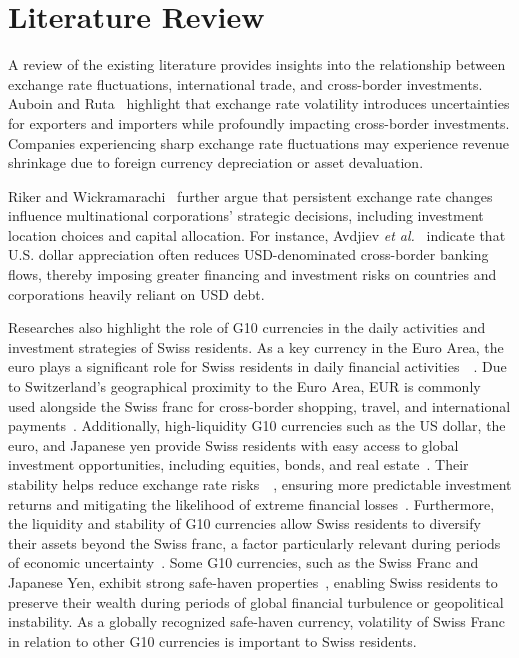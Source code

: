 \documentclass{article}
\begin{document}
\section{Literature Review}
A review of the existing literature provides insights into the relationship between exchange rate fluctuations, international trade, and cross-border investments. Auboin and Ruta~\cite{AUBOIN_RUTA_2013} highlight that exchange rate volatility introduces uncertainties for exporters and importers while profoundly impacting cross-border investments. Companies experiencing sharp exchange rate fluctuations may experience revenue shrinkage due to foreign currency depreciation or asset devaluation.

Riker and Wickramarachi~\cite{riker2020review} further argue that persistent exchange rate changes influence multinational corporations' strategic decisions, including investment location choices and capital allocation. For instance, Avdjiev \textit{et al.}~\cite{dollar_exchange} indicate that U.S. dollar appreciation often reduces USD-denominated cross-border banking flows, thereby imposing greater financing and investment risks on countries and corporations heavily reliant on USD debt.

Researches also highlight the role of G10 currencies in the daily activities and investment strategies of Swiss residents. As a key currency in the Euro Area, the euro plays a significant role for Swiss residents in daily financial activities~\cite{engel2016exchange}~\cite{goulferni2023switzerland}. Due to Switzerland's geographical proximity to the Euro Area, EUR is commonly used alongside the Swiss franc for cross-border shopping, travel, and international payments~\cite{sif_imf_reports}. Additionally, high-liquidity G10 currencies such as the US dollar, the euro, and Japanese yen provide Swiss residents with easy access to global investment opportunities, including equities, bonds, and real estate~\cite{rogoff2000six}. Their stability helps reduce exchange rate risks~\cite{campbell2002strategic}~\cite{engel2016exchange}, ensuring more predictable investment returns and mitigating the likelihood of extreme financial losses~\cite{de1998big}. Furthermore, the liquidity and stability of G10 currencies allow Swiss residents to diversify their assets beyond the Swiss franc, a factor particularly relevant during periods of economic uncertainty~\cite{ito2020currency}. Some G10 currencies, such as the Swiss Franc and Japanese Yen, exhibit strong safe-haven properties~\cite{ranaldo2010safe}, enabling Swiss residents to preserve their wealth during periods of global financial turbulence or geopolitical instability. As a globally recognized safe-haven currency, volatility of Swiss Franc in relation to other G10 currencies is important to Swiss residents.
\end{document}
